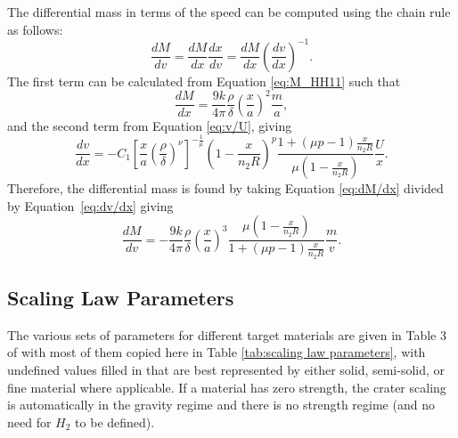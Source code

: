 \documentclass{article}
\begin{document}
The differential mass in terms of the speed can be computed using the chain rule as follows:
\begin{equation}\label{eq:dM/dv chain rule}
\frac{dM}{dv} = \frac{dM}{dx}\frac{dx}{dv} = \frac{dM}{dx}\left(\frac{dv}{dx}\right)^{-1}.
\end{equation}
The first term can be calculated from Equation \eqref{eq:M_HH11} such that
\begin{equation}\label{eq:dM/dx}
\frac{dM}{dx} = \frac{9k}{4\pi}\frac{\rho}{\delta}\left(\frac{x}{a}\right)^2\frac{m}{a},
\end{equation}
and the second term from Equation \eqref{eq:v/U}, giving
\begin{equation}\label{eq:dv/dx}
\frac{dv}{dx} = -C_1\left[\frac{x}{a}\left(\frac{\rho}{\delta}\right)^\nu\right]^{-\frac{1}{\mu}}\left(1 - \frac{x}{n_2 R}\right)^p
\frac{1+(\mu p -1)\frac{x}{n_2 R}}{\mu\left(1-\frac{x}{n_2 R}\right)}\frac{U}{x}.
\end{equation}
Therefore, the differential mass is found by taking Equation \eqref{eq:dM/dx} divided by Equation~\eqref{eq:dv/dx} giving
\begin{equation}\label{eq:dM/dv final}
\frac{dM}{dv} = -\frac{9k}{4\pi}\frac{\rho}{\delta}\left(\frac{x}{a}\right)^3\frac{\mu\left(1-\frac{x}{n_2 R}\right)}{1+(\mu p-1)\frac{x}{n_2 R}}\frac{m}{v}.
\end{equation}



\subsection{Scaling Law Parameters}\label{ssec:Scaling Law Parameters}

The various sets of parameters for different target materials are given in Table 3 of \cite{housen2011ejecta} with most of them copied here in Table \ref{tab:scaling law parameters}, with undefined values filled in that are best represented by either solid, semi-solid, or fine material where applicable. If a material has zero strength, the crater scaling is automatically in the gravity regime and there is no strength regime (and no need for $H_2$ to be defined).
\end{document}
